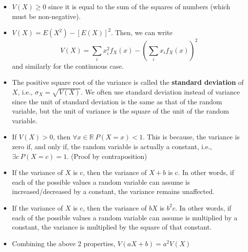 \begin{note}
\end{note}
\begin{itemize}
    \item $V(X) \geq 0$ since it is equal to the sum of the squares of numbers (which must be non-negative).
    \item $V(X) = E(X^2) - [E(X)]^2$. Then, we can write 
    $$
    V(X) = \sum_i x_i^2 f_X(x) - \left(\sum_i x_i f_X(x)\right)^2
    $$ and similarly for the continuous case.
    \item The positive square root of the variance is called the \textbf{standard deviation} of $X$, i.e., $\sigma_X = \sqrt{V(X)}$. We often use standard deviation instead of variance since the unit of standard deviation is the same as that of the random variable, but the unit of variance is the square of the unit of the random variable.
    \item If $V(X) > 0$, then $\forall x \in \mathbb{R} \ P(X = x) < 1$. This is because, the variance is zero if, and only if, the random variable is actually a constant, i.e., $\exists c \ P(X = c) = 1$. (Proof by contraposition)
    \item If the variance of $X$ is c, then the variance of $X + b$ is c. In other words, if each of the possible values a random variable can assume is increased/decreased by a constant, the variance remains unaffected.
    \item If the variance of $X$ is c, then the variance of $bX$ is $b^2c$. In other words, if each of the possible values a random variable can assume is multiplied by a constant, the variance is multiplied by the square of that constant.
    \item Combining the above 2 properties, $V(aX + b) = a^2V(X)$
\end{itemize}

